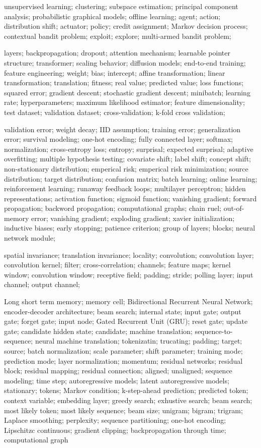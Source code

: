 \documentclass[letterpaper, oneside]{book}
\theoremstyle{definition}
\theoremstyle{remark}
\begin{document}
unsupervised learning; clustering; subspace estimation; principal component analysis; probabilistic graphical models; offline learning; agent; action; distribution shift; actuator; policy; credit assignment; Markov decision process; contextual bandit problem; exploit; explore; multi-armed bandit problem; 

layers; backpropagation; dropout; attention mechanism; learnable pointer structure; transformer; scaling behavior; diffusion models; end-to-end training; feature engineering; weight; bias; intercept; affine transformation; linear transformation; translation; fitness; real value; predicted value; loss functions; squared error; gradient descent; stochastic gradient descent; minibatch; learning rate; hyperparameters; maximum likelihood estimator; feature dimensionality; test dataset; validation dataset; cross-validation; k-fold cross validation;

validation error; weight decay; IID assumption; training error; generalization error; survival modeling; one-hot encoding; fully connected layer; softmax; normalization; cross-entropy loss; entropy; surprisal; expected surprisal; adaptive overfitting; multiple hypothesis testing; covariate shift; label shift; concept shift; non-stationary distribution; emperical risk; emperical risk minimization; source distribution; target distribution; confusion matrix; batch learning; online learning; reinforcement learning; runaway feedback loops; multilayer perceptron; hidden representations; activation function; sigmoid function; vanishing gradient; forward propagation; backword propagation; computational graphs; chain ruel; out-of-memory error; vanishing gradient; exploding gradient; xavier initialization; inductive biases; early stopping; patience criterion; group of layers; blocks; neural network module;

spatial invariance; translation invariance; locality; convolution; convolution layer; convolution kernel; filter; cross-correlation; channels; feature maps; kernel window; convolution window; receptive field; padding; stride; polling layer; input channel; output channel; 

Long short term memory; memory cell; Bidirectional Recurrent Neural Network; encoder-decoder architecture; beam search; internal state; input gate; output gate; forget gate; input node; Gated Recurrent Unit (GRU); reset gate; update gate; candidate hidden state; candidate; machine translation; sequence-to-sequence; neural machine translation; tokenizatin; trucating; padding; target; source; batch normalization; scale parameter; shift parameter; training mode; prediction mode; layer normalization; momentum; residual networks; residual block; residual mapping; residual connection; aligned; unaligned; sequence modeling; time step; autoregressive models; latent autoregressive models; stationary; tokens; Markov condition; k-step-ahead prediction; predicted token; context variable; embedding layer; greedy search; exhustive search; beam search; most likely token; most likely sequence; beam size; unigram; bigram; trigram; Laplace smoothing; perplexity; sequence partitioning; one-hot encoding; Lipschitzc continuous; gradient clipping; backpropagation through time; computational graph
\end{document}
